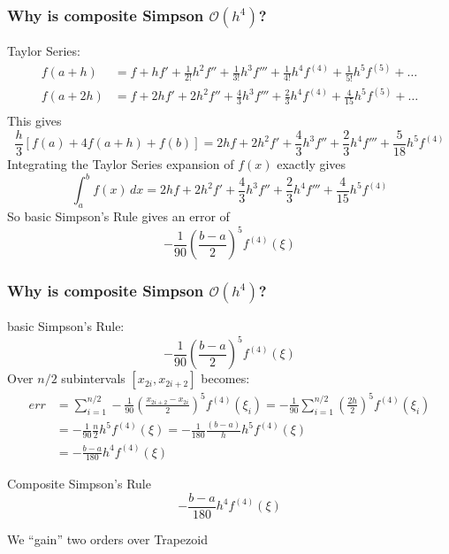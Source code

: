 \documentclass[10pt]{beamer}
\newcommand{\mO}{{\mathcal{O}}}
\begin{document}
\begin{frame}
\frametitle{Why is composite Simpson $\mO(h^4)$?}
Taylor Series:
\begin{align*}
f(a+h) & = f + hf' + \frac{1}{2!}h^2 f'' + \frac{1}{3!}h^3 f''' + \frac{1}{4!}h^4 f^{(4)} + \frac{1}{5!}h^5 f^{(5)} + \dots\\
f(a+2h) & = f + 2hf' + 2h^2 f'' + \frac{4}{3}h^3 f''' + \frac{2}{3}h^4 f^{(4)} + \frac{4}{15}h^5 f^{(5)} + \dots\\
\end{align*}
This gives
\begin{equation*}
\frac{h}{3}\left[f(a)+4f(a+h)+f(b)\right] = 2hf +2h^2f' + \frac{4}{3}h^3f''+\frac{2}{3}h^4f'''+\frac{5}{18}h^5f^{(4)}
\end{equation*}
Integrating the Taylor Series expansion of $f(x)$ exactly gives
\begin{equation*}
\int_{a}^{b}f(x)\,dx = 2hf +2h^2f' + \frac{4}{3}h^3f''+\frac{2}{3}h^4f'''+\frac{4}{15}h^5f^{(4)}
\end{equation*}
So basic Simpson's Rule gives an error of
\begin{equation*}
-\frac{1}{90}\left(\frac{b-a}{2}\right)^5 f^{(4)}(\xi)
\end{equation*}
\end{frame}
\begin{frame}
\frametitle{Why is composite Simpson $\mO(h^4)$?}
basic Simpson's Rule:
\begin{equation*}
-\frac{1}{90}\left(\frac{b-a}{2}\right)^5 f^{(4)}(\xi)
\end{equation*}
Over $n/2$ subintervals $[x_{2i},x_{2i+2}]$ becomes:
\begin{align*}
err & =  \sum_{i=1}^{n/2} -\frac{1}{90}\left(\frac{x_{2i+2}-x_{2i}}{2}\right)^5 f^{(4)}(\xi_i)
      = -\frac{1}{90}  \sum_{i=1}^{n/2} \left(\frac{2h}{2}\right)^5 f^{(4)}(\xi_i)\\
    & = -\frac{1}{90}  \frac{n}{2}h^5 f^{(4)}(\xi)
      = -\frac{1}{180} \frac{(b-a)}{h}h^5 f^{(4)}(\xi)\\
    & = -\frac{b-a}{180} h^4 f^{(4)}(\xi)
\end{align*}
\vspace{-0.5cm}

\begin{block}{Composite Simpson's Rule}
\begin{equation*}
  -\frac{b-a}{180}h^4 f^{(4)}(\xi)
\end{equation*}
\end{block}
We ``gain'' two orders over Trapezoid
\end{frame}
\end{document}
